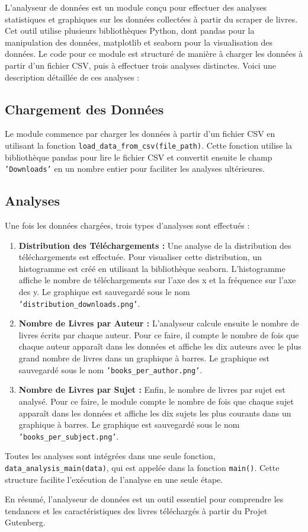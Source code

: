 L'analyseur de données est un module conçu pour effectuer des analyses statistiques et graphiques sur les données collectées à partir du scraper de livres. Cet outil utilise plusieurs bibliothèques Python, dont pandas pour la manipulation des données, matplotlib et seaborn pour la visualisation des données. Le code pour ce module est structuré de manière à charger les données à partir d'un fichier CSV, puis à effectuer trois analyses distinctes. Voici une description détaillée de ces analyses :

\subsection{Chargement des Données}
Le module commence par charger les données à partir d'un fichier CSV en utilisant la fonction \texttt{load\_data\_from\_csv(file\_path)}. Cette fonction utilise la bibliothèque pandas pour lire le fichier CSV et convertit ensuite le champ \texttt{'Downloads'} en un nombre entier pour faciliter les analyses ultérieures.

\subsection{Analyses}
Une fois les données chargées, trois types d'analyses sont effectués :

\begin{enumerate}
    \item \textbf{Distribution des Téléchargements :} Une analyse de la distribution des téléchargements est effectuée. Pour visualiser cette distribution, un histogramme est créé en utilisant la bibliothèque seaborn. L'histogramme affiche le nombre de téléchargements sur l'axe des x et la fréquence sur l'axe des y. Le graphique est sauvegardé sous le nom \texttt{'distribution\_downloads.png'}.
    \item \textbf{Nombre de Livres par Auteur :} L'analyseur calcule ensuite le nombre de livres écrits par chaque auteur. Pour ce faire, il compte le nombre de fois que chaque auteur apparaît dans les données et affiche les dix auteurs avec le plus grand nombre de livres dans un graphique à barres. Le graphique est sauvegardé sous le nom \texttt{'books\_per\_author.png'}.
    \item \textbf{Nombre de Livres par Sujet :} Enfin, le nombre de livres par sujet est analysé. Pour ce faire, le module compte le nombre de fois que chaque sujet apparaît dans les données et affiche les dix sujets les plus courants dans un graphique à barres. Le graphique est sauvegardé sous le nom \texttt{'books\_per\_subject.png'}.
\end{enumerate}

Toutes les analyses sont intégrées dans une seule fonction, \texttt{data\_analysis\_main(data)}, qui est appelée dans la fonction \texttt{main()}. Cette structure facilite l'exécution de l'analyse en une seule étape.

En résumé, l'analyseur de données est un outil essentiel pour comprendre les tendances et les caractéristiques des livres téléchargés à partir du Projet Gutenberg.

